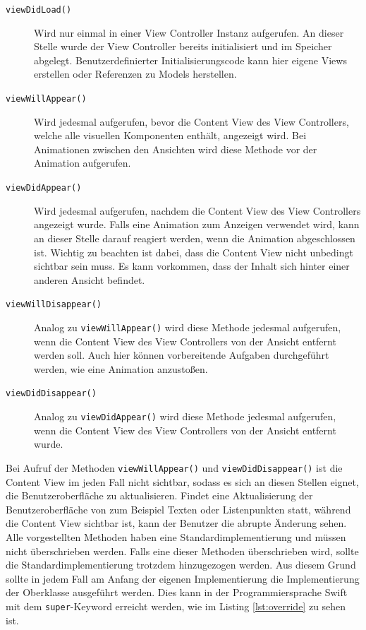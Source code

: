 \begin{description}
\item[\texttt{viewDidLoad()}]
Wird nur einmal in einer View Controller Instanz aufgerufen.
An dieser Stelle wurde der View Controller bereits initialisiert und im Speicher abgelegt.
Benutzerdefinierter Initialisierungscode kann hier eigene Views erstellen oder Referenzen zu Models herstellen.
\item[\texttt{viewWillAppear()}]
Wird jedesmal aufgerufen, bevor die Content View des View Controllers, welche alle visuellen Komponenten enthält, angezeigt wird.
Bei Animationen zwischen den Ansichten wird diese Methode vor der Animation aufgerufen.
\item[\texttt{viewDidAppear()}]
Wird jedesmal aufgerufen, nachdem die Content View des View Controllers angezeigt wurde.
Falls eine Animation zum Anzeigen verwendet wird, kann an dieser Stelle darauf reagiert werden, wenn die Animation abgeschlossen ist.
Wichtig zu beachten ist dabei, dass die Content View nicht unbedingt sichtbar sein muss.
Es kann vorkommen, dass der Inhalt sich hinter einer anderen Ansicht befindet.
\item[\texttt{viewWillDisappear()}]
Analog zu \texttt{viewWillAppear()} wird diese Methode jedesmal aufgerufen, wenn die Content View des View Controllers von der Ansicht entfernt werden soll.
Auch hier können vorbereitende Aufgaben durchgeführt werden, wie eine Animation anzustoßen.
\item[\texttt{viewDidDisappear()}]
Analog zu \texttt{viewDidAppear()} wird diese Methode jedesmal aufgerufen, wenn die Content View des View Controllers von der Ansicht entfernt wurde.
\end{description}
Bei Aufruf der Methoden \texttt{viewWillAppear()} und \texttt{viewDidDisappear()} ist die Content View im jeden Fall nicht sichtbar, sodass es sich an diesen Stellen eignet, die Benutzeroberfläche zu aktualisieren.
Findet eine Aktualisierung der Benutzeroberfläche von zum Beispiel Texten oder Listenpunkten statt, während die Content View sichtbar ist, kann der Benutzer die abrupte Änderung sehen.\pbreak%
%
Alle vorgestellten Methoden haben eine Standardimplementierung und müssen nicht überschrieben werden.
Falls eine dieser Methoden überschrieben wird, sollte die Standardimplementierung trotzdem hinzugezogen werden.
Aus diesem Grund sollte in jedem Fall am Anfang der eigenen Implementierung die Implementierung der Oberklasse ausgeführt werden.
Dies kann in der Programmiersprache Swift mit dem \texttt{super}-Keyword erreicht werden, wie im Listing \ref{lst:override} zu sehen ist.\\


